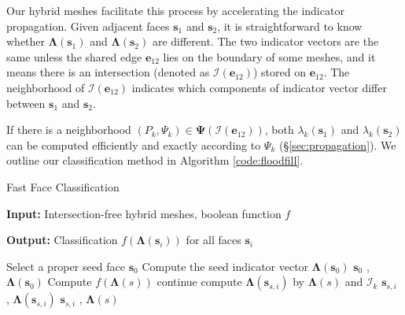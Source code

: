 \documentclass[10pt,journal,compsoc]{IEEEtran}
\begin{document}
Our hybrid meshes facilitate this process by accelerating the indicator propagation. Given adjacent faces $\bm{s}_1$ and $\bm{s}_2$, it is straightforward to know whether $\bm{\Lambda}(\bm{s}_1)$ and $\bm{\Lambda}(\bm{s}_2)$ are different. The two indicator vectors are the same unless the shared edge $\bm{e}_{12}$ lies on the boundary of some meshes, and it means there is an intersection (denoted as $\bm{\mathcal{I}}(\bm{e}_{12})$) stored on $\bm{e}_{12}$. The neighborhood of $\bm{\mathcal{I}}(\bm{e}_{12})$ indicates which components of indicator vector differ between $\bm{s}_1$ and $\bm{s}_2$.

If there is a neighborhood $(P_k, \Psi_k) \in \bm{\Psi}(\bm{\mathcal{I}}(\bm{e}_{12}))$, both $\lambda_k(\bm{s}_1)$ and $\lambda_k(\bm{s}_2)$ can be computed efficiently and exactly according to $\Psi_k$ (\S\ref{sec:propagation}). We outline our classification method in Algorithm \ref{code:floodfill}.

\begin{algorithm}
\caption{Fast Face Classification}
\label{code:floodfill}
\textbf{Input: } Intersection-free hybrid meshes, boolean function $f$

\textbf{Output: } Classification $f(\bm{\Lambda}(\bm{s}_i))$ for all faces $\bm{s}_i$


\begin{algorithmic}[1]
\State Select a proper seed face $\bm{s}_0$
\State Compute the seed indicator vector $\boldsymbol{\Lambda}(\bm{s}_0)$
\State {} { $\bm{s}_0$ , $\boldsymbol{\Lambda}(\bm{s}_0)$}
\State
{}
    \State Compute $f(\boldsymbol{\Lambda}(s))$
            \State continue
        \EndIf
            \State compute $\boldsymbol{\Lambda}(\bm{s}_{s, i})$ by $\boldsymbol{\Lambda}(s)$ and ${\bm{\mathcal{I}}}_k$
            \State {} { $\bm{s}_{s, i}$ , $\boldsymbol{\Lambda}(\bm{s}_{s, i})$}
        \Else
            \State {} { $\bm{s}_{s, i}$ , $\boldsymbol{\Lambda}(s)$}
        \EndIf
    \EndFor
\EndFunction
\end{algorithmic}
\end{algorithm}
\end{document}
